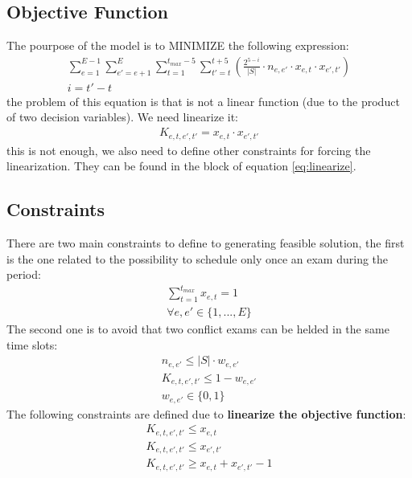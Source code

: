 \documentclass[12pt]{article}
\begin{document}
\subsection{Objective Function}
The pourpose of the model is to MINIMIZE the following expression:
\begin{equation}
  \begin{gathered}
    \sum_{e=1}^{E-1}\sum_{e'=e+1}^{E}\sum_{t=1}^{t_{max}-5}\sum_{t'=t}^{t+5} (\frac{2^{5-i}}{|S|} \cdot n_{e,e'} \cdot x_{e,t} \cdot x_{e',t'})\\
    i = t'-t
    \label{eq:fir}
  \end{gathered}
\end{equation}
the problem of this equation is that is not a linear function (due to the product of two decision variables). We need linearize it:
\begin{equation}
  \begin{gathered}
    K_{e,t,e',t'} = x_{e,t} \cdot x_{e',t'}
    \label{eq:sec}
  \end{gathered}
\end{equation}
this is not enough, we also need to define other constraints for forcing the linearization. They can be found in the block of equation \ref{eq:linearize}.

\subsection{Constraints}
There are two main constraints to define to generating feasible solution, the first is the one related to the possibility to schedule only once an exam during the period:
\begin{equation}
  \begin{gathered}
     \sum_{t=1}^{t_{max}} x_{e,t} = 1\\
     \forall e, e' \in \{1,...,E\}
  \end{gathered}
\end{equation}
The second one is to avoid that two conflict exams can be helded in the same time slots:
\begin{equation}
  \begin{gathered}
     n_{e,e'} \leq |S| \cdot w_{e,e'}\\
     K_{e,t,e',t'} \leq 1 - w_{e,e'}\\
     w_{e,e'} \in \{0,1\}
  \end{gathered}
\end{equation}
The following constraints are defined due to \textbf{linearize the objective function}:
\begin{equation}
  \begin{gathered}
     K_{e,t,e',t'} \leq x_{e,t}\\
     K_{e,t,e',t'} \leq x_{e',t'}\\
     K_{e,t,e',t'} \geq x_{e,t} + x_{e',t'} - 1\\
     \label{eq:linearize}
  \end{gathered}
\end{equation}
\end{document}
